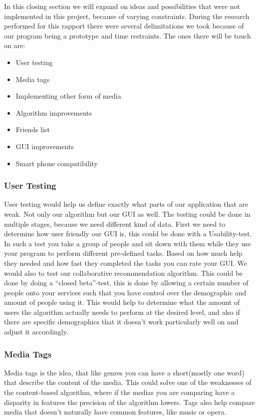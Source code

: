 In this closing section we will expand on ideas and possibilities that were not implemented in this project, because of varying constraints. During the research performed for this rapport there were several delimitations we took because of our program being a prototype and time restraints. The ones there will be touch on are:
\begin{itemize}
	\item User testing
	\item Media tags
	\item Implementing other form of media
	\item Algorithm improvements
	\item Friends list
	\item GUI improvements
	\item Smart phone compatibility 
\end{itemize}

\subsubsection{User Testing}
User testing would help us define exactly what parts of our application that are weak. Not only our algorithm but our GUI as well. The testing could be done in multiple stages, because we need different kind of data. First we need to determine how user friendly our GUI is, this could be done with a Usability-test. In such a test you take a group of people and sit down with them while they use your program to perform different pre-defined tasks. Based on how much help they needed and how fast they completed the tasks you can rate your GUI. We would also to test our collaborative recommendation algorithm. This could be done by doing a “closed beta”-test, this is done by allowing a certain number of people onto your services such that you have control over the demographic and amount of people using it. This would help to determine what the amount of users the algorithm actually needs to perform at the desired level, and also if there are specific demographics that it doesn't work particularly well on and adjust it accordingly.

\subsubsection{Media Tags}\label{futureWork:Tags}
Media tags is the idea, that like genres you can have a short(mostly one word) that describe the content of the media. This could solve one of the weaknesses of the content-based algorithm, where if the medias you are comparing have a disparity in features the precision of the algorithm lowers. Tags also help compare media that doesn't naturally have common features, like music or opera.

